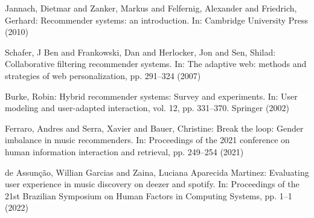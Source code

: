 \documentclass[runningheads,a4paper]{llncs}
\begin{document}
\begin{thebibliography}{4}
 Jannach, Dietmar and Zanker, Markus and Felfernig, Alexander and Friedrich, Gerhard: 
Recommender systems: an introduction. In: Cambridge University Press (2010)

 Schafer, J Ben and Frankowski, Dan and Herlocker, Jon and Sen, Shilad:
Collaborative filtering recommender systems. In: The adaptive web: methods and strategies of web personalization,
pp. 291--324 (2007)

 Burke, Robin: Hybrid recommender systems: Survey and experiments. In:
User modeling and user-adapted interaction, vol. 12, pp. 331--370. Springer (2002)

 Ferraro, Andres and Serra, Xavier and Bauer, Christine:
Break the loop: Gender imbalance in music recommenders. In:
Proceedings of the 2021 conference on human information interaction and retrieval,
pp. 249--254 (2021)

 de Assun{\c{c}}{\~a}o, Willian Garcias and Zaina, Luciana Aparecida Martinez:
Evaluating user experience in music discovery on deezer and spotify. In:
Proceedings of the 21st Brazilian Symposium on Human Factors in Computing Systems, pp. 1--1 (2022)







\end{thebibliography}
\end{document}
